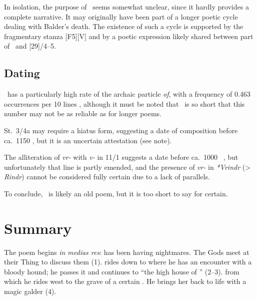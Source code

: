 In isolation, the purpose of \Baldrsdraumar\ seems somewhat unclear, since it hardly provides a complete narrative.  It may originally have been part of a longer poetic cycle dealing with Balder’s death.  The existence of such a cycle is supported by the fragmentary stanza [F5][V] and by a poetic expression likely shared between part of \Gylfaginning\ and [29]/4--5.

\subsection{Dating}

\Baldrsdraumar\ has a particularly high rate of the archaic particle \emph{of}, with a frequency of 0.463 occurrences per 10 lines \parencite[70]{Sapp2022}, although it must be noted that \Baldrsdraumar\ is so short that this number may not be as reliable as for longer poems.

St.~3/4a may require a hiatus form, suggesting a date of composition before ca.~1150 \ce, but it is an uncertain attestation (see note).

The alliteration of \emph{vr-} with \emph{v-} in 11/1 suggests a date before ca.~1000 \ce\ \parencite{Haukur2016}, but unfortunately that line is partly emended, and the presence of \emph{vr-} in \emph{*Vrindr} (> \emph{Rindr}) cannot be considered fully certain due to a lack of parallels.

To conclude, \Baldrsdraumar\ is likely an old poem, but it is too short to say for certain.

\section{Summary}

The poem begins \emph{in medias res}:  has been having nightmares.  The Gods meet at their Thing to discuss them (1).   rides down to  where he has an encounter with a bloody hound; he passes it and continues to “the high house of ” (2--3). from which he rides west to the grave of a certain .  He brings her back to life with a magic galder (4).

